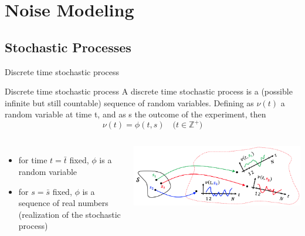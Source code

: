 \documentclass[
10pt,
aspectratio=169,
]{beamer}
\begin{document}
\section{Noise Modeling}
\subsection{Stochastic Processes}
\begin{frame}[c]{Discrete time stochastic process}
	
\begin{block}{Discrete time stochastic process}
	A discrete time stochastic process is a (possible infinite but still countable) sequence of random variables. Defining as $\nu(t)$ a random variable at time t, and as s the outcome of the
experiment, then 
\[\nu(t) = \phi(t,s) \quad \bigl( t \in \mathbb{Z}^+\bigr)\]
\end{block}
 \begin{columns}
             \begin{itemize}
 \item for time $t=\bar{t}$  fixed, $\phi$ is a random variable
 \vfill
 \item for $s = \bar{s}$ fixed, $\phi$ is a sequence of real numbers (realization of the stochastic process)
\end{itemize}
        \hfill
             \centering
             \includegraphics[height=0.4\textheight]{stoc_process.png}
         \end{columns} 
\end{frame}
\end{document}
